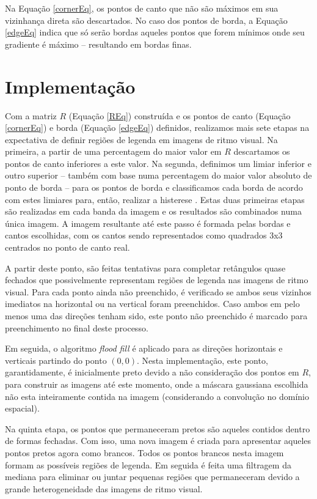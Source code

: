 \documentclass[12pt]{article}
\begin{document}
Na Equação \ref{cornerEq},  os pontos de canto que  não são máximos em
sua vizinhança direta são descartados.  No caso dos pontos de borda, a
Equação  \ref{edgeEq} indica que  só serão  bordas aqueles  pontos que
forem  mínimos onde  seu gradiente  é máximo  -- resultando  em bordas
finas.

\section{Implementação}

Com a matriz  $R$ (Equação \ref{REq}) construída e  os pontos de canto
(Equação  \ref{cornerEq}) e  borda  (Equação \ref{edgeEq})  definidos,
realizamos  mais sete  etapas  na expectativa  de  definir regiões  de
legenda  em imagens  de ritmo  visual. Na  primeira, a  partir  de uma
percentagem  do maior  valor em  $R$  descartamos os  pontos de  canto
inferiores a  este valor. Na  segunda, definimos um limiar  inferior e
outro  superior --  também com  base numa  percentagem do  maior valor
absoluto de ponto de borda --  para os pontos de borda e classificamos
cada  borda de  acordo  com  estes limiares  para,  então, realizar  a
histerese   \cite{snakebook}.   Estas   duas   primeiras  etapas   são
realizadas em cada banda da imagem e os resultados são combinados numa
única  imagem.  A  imagem resultante  até este  passo é  formada pelas
bordas  e cantos escolhidas,  com os  cantos sendo  representados como
quadrados 3x3 centrados no ponto de canto real.

A partir deste ponto,  são feitas tentativas para completar retângulos
quase fechados  que possivelmente  representam regiões de  legenda nas
imagens  de ritmo  visual. Para  cada  ponto ainda  não preenchido,  é
verificado  se  ambos seus  vizinhos  imediatos  na  horizontal ou  na
vertical foram preenchidos.  Caso ambos  em pelo menos uma das direções
tenham sido, este ponto não preenchido é marcado para preenchimento no
final deste processo.

Em  seguida,  o  algoritmo  \textit{flood  fill} é  aplicado  para  as
direções  horizontais e verticais  partindo do  ponto $(0,  0)$. Nesta
implementação, este ponto, garantidamente, é inicialmente preto devido
a não  consideração dos pontos em  $R$, para construir  as imagens até
este momento, onde a máscara gaussiana escolhida não esta inteiramente
contida na imagem (considerando a convolução no domínio espacial).

Na  quinta  etapa,  os  pontos  que permaneceram  pretos  são  aqueles
contidos dentro de formas fechadas. Com isso, uma nova imagem é criada
para apresentar  aqueles pontos pretos  agora como brancos.   Todos os
pontos brancos  nesta imagem formam  as possíveis regiões  de legenda.
Em  seguida  é  feita  uma  filtragem  da  mediana  para  eliminar  ou
juntar   pequenas   regiões   que   permaneceram   devido   a   grande
heterogeneidade das imagens de ritmo visual.
\end{document}
